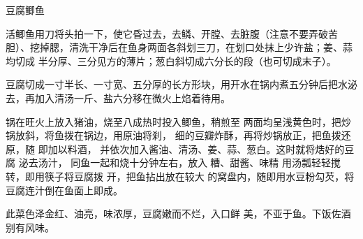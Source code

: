 \begin{recipe}{豆腐鲫鱼}

\ingredients


\preparation

\step 活鲫鱼用刀将头拍一下，使它昏过去，去鳞、开膛、去脏腹（注意不要弄破苦
胆）、挖掉腮，清洗干净后在鱼身两面各斜划三刀，在划口处抹上少许盐；姜、蒜均切成
半分厚、三分见方的薄片；葱白斜切成六分长的段（也可切成末子）。

\step 豆腐切成一寸半长、一寸宽、五分厚的长方形块，用开水在锅内煮五分钟后把水泌
去，再加入清汤一斤、盐六分移在微火上焰着待用。

\step 锅在旺火上放入猪油，烧至八成热时投入鲫鱼，稍煎至 两面均呈浅黄色时，把炒
锅放斜，将鱼拨在锅边，用原油将刹， 细的豆瓣炸酥，再将炒锅放正，把鱼拨还原，随
即加以料酒， 并依次加入酱油、清汤、姜、蒜、葱白。这时就将焅好的豆腐 泌去汤汁，
同鱼一起和烧十分钟左右，放入𰪿糟、甜酱、味精 用汤瓢轻轻搅转，即用筷子将豆腐拨
开，把鱼拈出放在较大 的窝盘内，随即用水豆粉勾芡，将豆腐连汁倒在鱼面上即成。

\features

此菜色泽金红、油亮，味浓厚，豆腐嫩而不烂，入口鲜 美，不亚于鱼。下饭佐酒别有风味。

\end{recipe}

